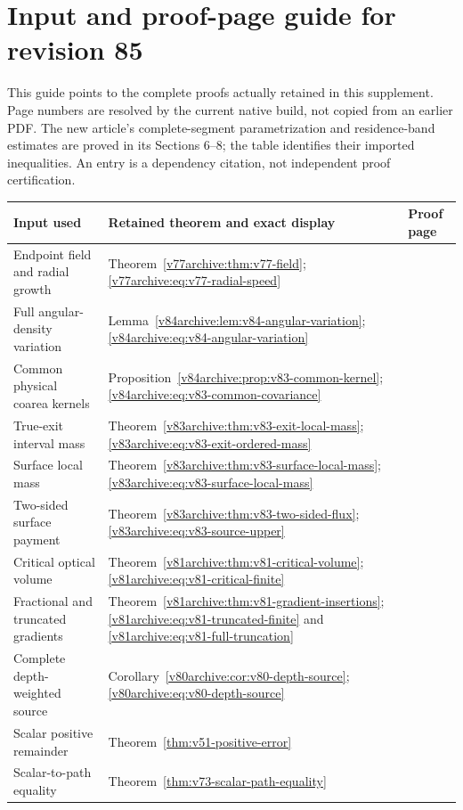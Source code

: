 \clearpage
\section*{Input and proof-page guide for revision 85}
\label{v85:dependency-guide}
This guide points to the complete proofs actually retained in this
supplement. Page numbers are resolved by the current native build,
not copied from an earlier PDF. The new article's complete-segment
parametrization and residence-band estimates are proved in its
Sections 6--8; the table identifies their imported inequalities.
An entry is a dependency citation, not independent proof certification.

\begin{center}\small
\begin{tabular}{p{}p{}p{}}
\hline
Input used & Retained theorem and exact display & Proof page\\
\hline
Endpoint field and radial growth &
Theorem~\ref{v77archive:thm:v77-field};
\eqref{v77archive:eq:v77-radial-speed} &
\pageref{v77archive:thm:v77-field}\\[4pt]
Full angular-density variation &
Lemma~\ref{v84archive:lem:v84-angular-variation};
\eqref{v84archive:eq:v84-angular-variation} &
\pageref{v84archive:lem:v84-angular-variation}\\[4pt]
Common physical coarea kernels &
Proposition~\ref{v84archive:prop:v83-common-kernel};
\eqref{v84archive:eq:v83-common-covariance} &
\pageref{v84archive:prop:v83-common-kernel}\\[4pt]
True-exit interval mass &
Theorem~\ref{v83archive:thm:v83-exit-local-mass};
\eqref{v83archive:eq:v83-exit-ordered-mass} &
\pageref{v83archive:thm:v83-exit-local-mass}\\[4pt]
Surface local mass &
Theorem~\ref{v83archive:thm:v83-surface-local-mass};
\eqref{v83archive:eq:v83-surface-local-mass} &
\pageref{v83archive:thm:v83-surface-local-mass}\\[4pt]
Two-sided surface payment &
Theorem~\ref{v83archive:thm:v83-two-sided-flux};
\eqref{v83archive:eq:v83-source-upper} &
\pageref{v83archive:thm:v83-two-sided-flux}\\[4pt]
Critical optical volume &
Theorem~\ref{v81archive:thm:v81-critical-volume};
\eqref{v81archive:eq:v81-critical-finite} &
\pageref{v81archive:thm:v81-critical-volume}\\[4pt]
Fractional and truncated gradients &
Theorem~\ref{v81archive:thm:v81-gradient-insertions};
\eqref{v81archive:eq:v81-truncated-finite} and
\eqref{v81archive:eq:v81-full-truncation} &
\pageref{v81archive:thm:v81-gradient-insertions}\\[4pt]
Complete depth-weighted source &
Corollary~\ref{v80archive:cor:v80-depth-source};
\eqref{v80archive:eq:v80-depth-source} &
\pageref{v80archive:cor:v80-depth-source}\\[4pt]
Scalar positive remainder &
Theorem~\ref{thm:v51-positive-error} &
\pageref{thm:v51-positive-error}\\[4pt]
Scalar-to-path equality &
Theorem~\ref{thm:v73-scalar-path-equality} &
\pageref{thm:v73-scalar-path-equality}\\
\hline
\end{tabular}
\end{center}
